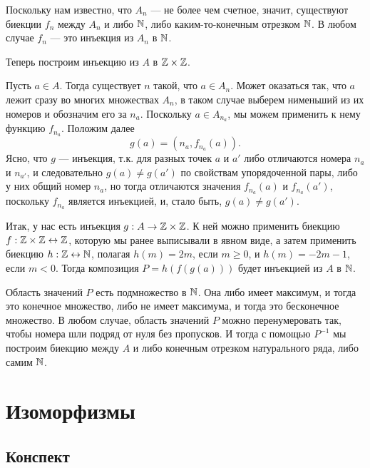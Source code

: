 \begin{enumerate}
Поскольку нам известно, что $A_n$ --- не более чем счетное, значит, существуют биекции $f_n$ между $A_n$ и либо $\mathbb N$, либо каким-то-конечным отрезком $\mathbb N$. В любом случае $f_n$ --- это инъекция из $A_n$ в $\mathbb N$.

Теперь построим инъекцию из $A$ в $\mathbb Z\times\mathbb Z$.

Пусть $a\in A$. Тогда существует $n$ такой, что $a\in A_n$. Может оказаться так, что $a$ лежит сразу во многих множествах $A_n$, в таком случае выберем нименьший из их номеров и обозначим его за $n_a$. Поскольку $a\in A_{n_a}$, мы можем применить к нему функцию $f_{n_a}$. Положим далее
$$
g(a) = (n_a,f_{n_a}(a)).
$$
Ясно, что $g$ --- инъекция, т.к. для разных точек $a$ и $a'$ либо отличаются номера $n_a$ и $n_{a'}$, и следовательно $g(a)\ne g(a')$ по свойствам упорядоченной пары, либо у них общий номер $n_a$, но тогда отличаются значения $f_{n_a}(a)$ и $f_{n_a}(a')$, поскольку $f_{n_a}$ является инъекцией, и, стало быть, $g(a)\ne g(a')$.

Итак, у нас есть инъекция $g:A\to\mathbb Z\times\mathbb Z$. К ней можно применить биекцию $f:\mathbb Z\times\mathbb Z\leftrightarrow\mathbb Z$, которую мы ранее выписывали в явном виде, а затем применить биекцию $h:\mathbb Z\leftrightarrow\mathbb N$, полагая $h(m)=2m$, если $m\ge 0$, и $h(m)=-2m-1$, если $m<0$. Тогда композиция $P=h(f(g(a)))$ будет инъекцией из $A$ в $\mathbb N$.

Область значений $P$ есть подмножество в $\mathbb N$. Она либо имеет максимум, и тогда это конечное множество, либо не имеет максимума, и тогда это бесконечное множество. В любом случае, область значений $P$ можно перенумеровать так, чтобы номера шли подряд от нуля без пропусков. И тогда с помощью $P^{-1}$ мы построим биекцию между $A$ и либо конечным отрезком натурального ряда, либо самим $\mathbb N$.\epf

\end{enumerate}


\section{Изоморфизмы}

\subsection*{Конспект}

